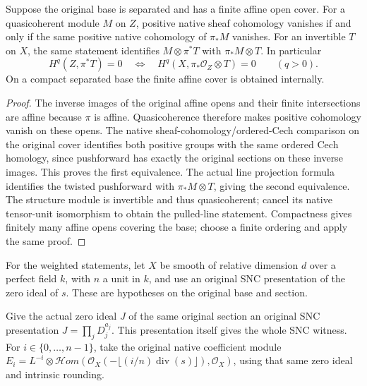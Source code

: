 \begin{lemma}
\label{lem:kn-normalized-affine-cohomology}
\leanok
{}
Suppose the original base is separated and has a finite affine open
cover.  For a quasicoherent module $M$ on $Z$, positive native sheaf
cohomology vanishes if and only if the same positive native
cohomology of $\pi_*M$ vanishes.  For an invertible $T$ on $X$, the
same statement identifies $M\otimes\pi^*T$ with $\pi_*M\otimes T$.
In particular
\[
 H^q(Z,\pi^*T)=0
 \quad\Longleftrightarrow\quad
 H^q(X,\pi_*\mathcal O_Z\otimes T)=0\qquad(q>0).
\]
On a compact separated base the finite affine cover is obtained
internally.
\end{lemma}
\begin{proof}
The inverse images of the original affine opens and their finite
intersections are affine because $\pi$ is affine.  Quasicoherence
therefore makes positive cohomology vanish on these opens.  The
native sheaf-cohomology/ordered-Cech comparison on the original
cover identifies both positive groups with the same ordered Cech
homology, since pushforward has exactly the original sections on
these inverse images.  This proves the first equivalence.  The
actual line projection formula identifies the twisted pushforward
with $\pi_*M\otimes T$, giving the second equivalence.  The
structure module is invertible and thus quasicoherent; cancel its
native tensor-unit isomorphism to obtain the pulled-line statement.
Compactness gives finitely many affine opens covering the base;
choose a finite ordering and apply the same proof.
\end{proof}

For the weighted statements, let $X$ be smooth of relative
dimension $d$ over a perfect field $k$, with $n$ a unit in $k$,
and use an original SNC presentation of the zero ideal of $s$.
These are hypotheses on the original base and section.

\begin{definition}
\label{def:kn-normalized-coefficients}

Give the actual zero ideal $J$ of the same original section an
original SNC presentation $J=\prod_j D_j^{a_j}$.  This presentation
itself gives the whole SNC witness.  For $i\in\{0,\ldots,n-1\}$,
take the original native coefficient module
$E_i=L^{-i}\otimes\mathcal Hom(\mathcal O_X(-\lfloor(i/n)\operatorname{div}(s)\rfloor),
\mathcal O_X)$, using that same zero ideal and intrinsic rounding.
\end{definition}

